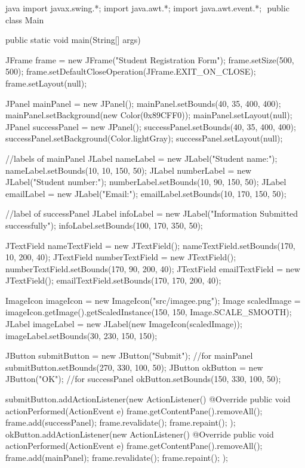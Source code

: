 \begin{codebox}{java}
import javax.swing.*;
import java.awt.*;
import java.awt.event.*;
‌
public class Main{
   public static void main(String[] args) {  
      JFrame frame = new JFrame("Student Registration Form");  
      frame.setSize(500, 500);  
      frame.setDefaultCloseOperation(JFrame.EXIT_ON_CLOSE);  
      frame.setLayout(null);  
  
      JPanel mainPanel = new JPanel();  
      mainPanel.setBounds(40, 35, 400, 400);  
      mainPanel.setBackground(new Color(0x89CFF0));
      mainPanel.setLayout(null);  
      JPanel successPanel = new JPanel();  
      successPanel.setBounds(40, 35, 400, 400);  
      successPanel.setBackground(Color.lightGray);
      successPanel.setLayout(null);

      //labels of mainPanel  
      JLabel nameLabel = new JLabel("Student name:");  
      nameLabel.setBounds(10, 10, 150, 50);  
      JLabel numberLabel = new JLabel("Student number:");  
      numberLabel.setBounds(10, 90, 150, 50);  
      JLabel emailLabel = new JLabel("Email:");  
      emailLabel.setBounds(10, 170, 150, 50);

      //label of successPanel  
      JLabel infoLabel = new JLabel("Information Submitted successfully");  
      infoLabel.setBounds(100, 170, 350, 50);  


      JTextField nameTextField = new JTextField();  
      nameTextField.setBounds(170, 10, 200, 40);  
      JTextField numberTextField = new JTextField();  
      numberTextField.setBounds(170, 90, 200, 40);  
      JTextField emailTextField = new JTextField();  
      emailTextField.setBounds(170, 170, 200, 40);  

      ImageIcon imageIcon = new ImageIcon("src/imagee.png");  
      Image scaledImage = imageIcon.getImage().getScaledInstance(150, 150, Image.SCALE_SMOOTH);  
      JLabel imageLabel = new JLabel(new ImageIcon(scaledImage));  
      imageLabel.setBounds(30, 230, 150, 150);  
  
      JButton submitButton = new JButton("Submit"); //for mainPanel  
      submitButton.setBounds(270, 330, 100, 50);   
      JButton okButton = new JButton("OK"); //for successPanel  
      okButton.setBounds(150, 330, 100, 50);


      submitButton.addActionListener(new ActionListener() {
         @Override
         public void actionPerformed(ActionEvent e){
            frame.getContentPane().removeAll();
            frame.add(successPanel);
            frame.revalidate();
            frame.repaint();  
         }  
      });  
      okButton.addActionListener(new ActionListener() {
         @Override
         public void actionPerformed(ActionEvent e){
            frame.getContentPane().removeAll();
            frame.add(mainPanel);
            frame.revalidate();
            frame.repaint();  
         }  
      });  

}}
\end{codebox}
